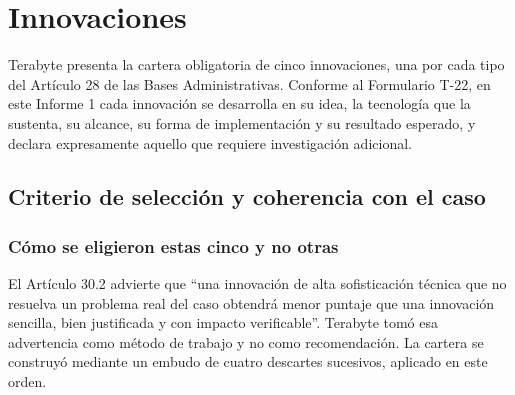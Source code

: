 %
%

\section{Innovaciones}


\noindent
Terabyte presenta la cartera obligatoria de cinco innovaciones, una por cada
tipo del Artículo 28\textdegree{} de las Bases Administrativas. Conforme al
Formulario T-22, en este Informe 1 cada innovación se desarrolla en su idea,
la tecnología que la sustenta, su alcance, su forma de implementación y su
resultado esperado, y declara expresamente aquello que requiere investigación
adicional.

\subsection{Criterio de selección y coherencia con el caso}

\subsubsection{Cómo se eligieron estas cinco y no otras}

El Artículo 30.2 advierte que \enquote{una innovación de alta sofisticación
técnica que no resuelva un problema real del caso obtendrá menor puntaje que
una innovación sencilla, bien justificada y con impacto verificable}. Terabyte
tomó esa advertencia como método de trabajo y no como recomendación. La cartera
se construyó mediante un embudo de cuatro descartes sucesivos, aplicado en este
orden.

